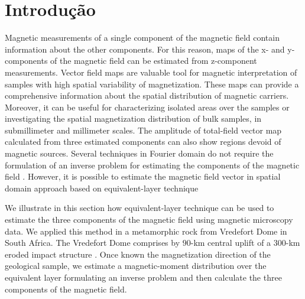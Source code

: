 \chapter{Introdução}

Magnetic measurements of a single component of the magnetic field contain information about the other components. For this reason, maps of the x- and y-components of the magnetic field can be estimated from z-component measurements. Vector field maps are valuable tool for magnetic interpretation of samples with high spatial variability of magnetization. These maps can provide a comprehensive information about the spatial distribution of magnetic carriers. Moreover, it can be useful for characterizing isolated areas over the samples or investigating the spatial magnetization distribution of bulk samples, in submillimeter and millimeter scales. The amplitude of total-field vector map calculated from three estimated components can also show regions devoid of magnetic sources. Several techniques in Fourier domain do not require the formulation of an inverse problem for estimating the components of the magnetic field \citep[e.g.,][]{lourenco_morrison_1973,lima_weiss_2009}. However, it is possible to estimate the magnetic field vector in spatial domain approach based on equivalent-layer technique \citep[e.g.,][]{li_li_2014}

We illustrate in this section how equivalent-layer technique can be used to estimate the three components of the magnetic field using magnetic microscopy data. We applied this method in a metamorphic rock from Vredefort Dome in South Africa. The Vredefort Dome comprises by $90$-km central uplift of a $300$-km eroded impact structure \citep{lana_etal_2003}. Once known the magnetization direction of the geological sample, we estimate a magnetic-moment distribution over the equivalent layer formulating an inverse problem and then calculate the three components of the magnetic field.  
  

